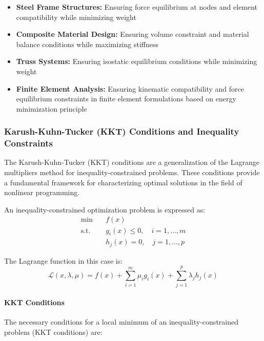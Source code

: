 \begin{tcolorbox}[title=Applications of Lagrange Method in Structural Optimization]
\begin{itemize}
    \item \textbf{Steel Frame Structures:} Ensuring force equilibrium at nodes and element compatibility while minimizing weight
    
    \item \textbf{Composite Material Design:} Ensuring volume constraint and material balance conditions while maximizing stiffness
    
    \item \textbf{Truss Systems:} Ensuring isostatic equilibrium conditions while minimizing weight
    
    \item \textbf{Finite Element Analysis:} Ensuring kinematic compatibility and force equilibrium constraints in finite element formulations based on energy minimization principle
\end{itemize}
\end{tcolorbox}

\subsubsection{Karush-Kuhn-Tucker (KKT) Conditions and Inequality Constraints}

The Karush-Kuhn-Tucker (KKT) conditions are a generalization of the Lagrange multipliers method for inequality-constrained problems. These conditions provide a fundamental framework for characterizing optimal solutions in the field of nonlinear programming.

An inequality-constrained optimization problem is expressed as:
\begin{equation}
\begin{aligned}
\min & \quad f(x) \\
\text{s.t.} & \quad g_i(x) \leq 0, \quad i = 1, \ldots, m \\
& \quad h_j(x) = 0, \quad j = 1, \ldots, p
\end{aligned}
\end{equation}

The Lagrange function in this case is:
\begin{equation}
\mathcal{L}(x,\lambda,\mu) = f(x) + \sum_{i=1}^m \mu_i g_i(x) + \sum_{j=1}^p \lambda_j h_j(x)
\end{equation}

\paragraph{KKT Conditions}
The necessary conditions for a local minimum of an inequality-constrained problem (KKT conditions) are:

